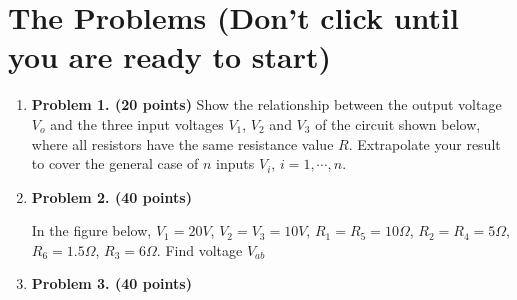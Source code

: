 \section*{The Problems (Don't click until you are ready to start)}
\begin{enumerate}

\item {\bf Problem 1. (20 points)} 
Show the relationship between the output voltage $V_o$ and the three input
voltages $V_1$, $V_2$ and $V_3$ of the circuit shown below, where all 
resistors have the same resistance value $R$. Extrapolate your result to 
cover the general case of $n$ inputs $V_i$, $i=1,\cdots,n$.


\begin{comment}
{\bf Solution:}

\[ \frac{V_1-V_0}{R}+\frac{V_2-V_0}{R}+\frac{V_3-V_0}{R}=\frac{V_0}{R}
,\;\;\;\;\; V_0=\frac{V_1+V_2+V_3}{4}	\]
In general
\[ V_0=\frac{1}{n+1}\sum_{i=1}^n V_i \]
\end{comment}


\item {\bf Problem 2. (40 points)} 

In the figure below, $V_1=20V$, $V_2=V_3=10V$, $R_1=R_5=10\Omega$, 
$R_2=R_4=5\Omega$, $R_6=1.5\Omega$, $R_3=6\Omega$. Find voltage $V_{ab}$


\begin{comment}
{\bf Solution:} Use Thevenin's theorem. 
\begin{itemize}
\item Remove $R_3$ and $V_3$ as the load
\item Find open-circuit voltage $V_T$:
\[	V_{ab}=V_a-V_b=V_1\frac{R_5}{R_1+R_5}-V_2\frac{R_4}{R_2+R_4}
	=20 \frac{10}{10+10}-10 \frac{5}{5+5}=10-5=5 \]
\item Find $R_T$:
\[	R_T=R_1//R_5+R_6+R_2//R_4
	=\frac{R_1R_5}{R_1+R_5}+R_6+\frac{R_4R_2}{R_2+R_4}=9 \]
\item Connect load of $V_3$ and $R_3$, find current
\[	I=\frac{V_T-V_3}{R_T+R_3}=\frac{5-10}{9+6}=-\frac{1}{3} \]
\item Find $V_{ab}$
\[	V_{ab}=-\frac{1}{3}\times 6 +10=8V	\]
\end{itemize}
\end{comment}

\item {\bf Problem 3. (40 points)} 


\end{enumerate}
